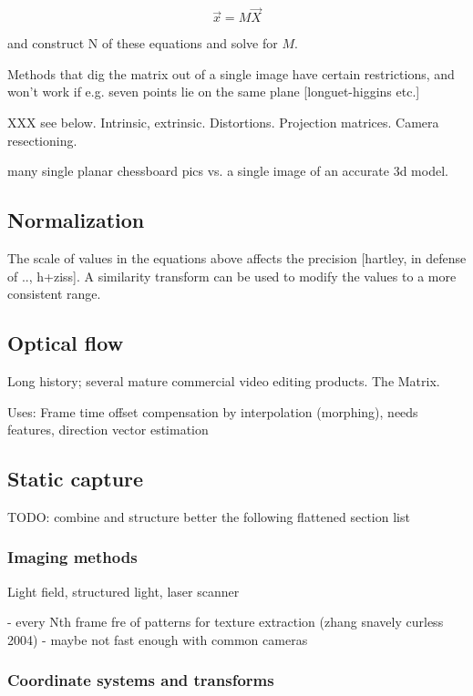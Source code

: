 \[
	\vec x = M \vec X
\]

and construct N of these equations and solve for $M$.

Methods that dig the matrix out of a single image have certain restrictions, and won't work if e.g. seven points lie on the same plane [longuet-higgins etc.]

XXX see below. Intrinsic, extrinsic. Distortions. Projection matrices. Camera resectioning.

many single planar chessboard pics vs. a single image of an accurate 3d model.

\subsection{Normalization}

The scale of values in the equations above affects the precision [hartley, in defense of .., h+ziss]. A similarity transform can be used to modify the values to a more consistent range.


\subsection{Optical flow}

Long history; several mature commercial video editing products. The Matrix.

Uses: Frame time offset compensation by interpolation (morphing), needs features, direction vector estimation

\subsection{Static capture}

TODO: combine and structure better the following flattened section list

\subsubsection{Imaging methods}

Light field, structured light, laser scanner

- every Nth frame fre of patterns for texture extraction (zhang snavely curless 2004)
- maybe not fast enough with common cameras

\subsubsection{Coordinate systems and transforms}

